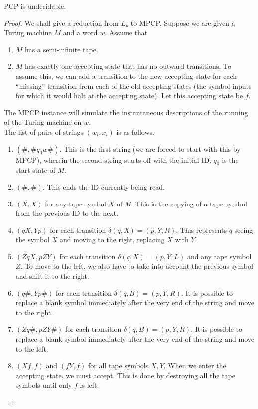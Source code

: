 	\begin{ftheo}
		\textsf{PCP} is undecidable.
	\end{ftheo}
	\begin{proof}
		We shall give a reduction from $L_u$ to \textsf{MPCP}. Suppose we are given a Turing machine $M$ and a word $w$. Assume that
		\begin{enumerate}
			\item $M$ has a semi-infinite tape.
			\item $M$ has exactly one accepting state that has no outward transitions. To assume this, we can add a transition to the new accepting state for each ``missing'' transition from each of the old accepting states (the symbol inputs for which it would halt at the accepting state). Let this accepting state be $f$.  
		\end{enumerate}
		The \textsf{MPCP} instance will simulate the instantaneous descriptions of the running of the Turing machine on $w$.\\
		The list of pairs of strings $(w_i,x_i)$ is as follows.
		\begin{enumerate}
			\item $(\#,\#q_0w\#)$. This is the first string (we are forced to start with this by \textsf{MPCP}), wherein the second string starts off with the initial ID. $q_0$ is the start state of $M$.
			\item $(\#,\#)$. This ends the ID currently being read.
			\item $(X,X)$ for any tape symbol $X$ of $M$. This is the copying of a tape symbol from the previous ID to the next.
			\item $(qX,Yp)$ for each transition $\delta(q,X) = (p,Y,R)$. This represents $q$ seeing the symbol $X$ and moving to the right, replacing $X$ with $Y$.
			\item $(ZqX,pZY)$ for each transition $\delta(q,X) = (p,Y,L)$ and any tape symbol $Z$. To move to the left, we also have to take into account the previous symbol and shift it to the right.
			\item $(q\#,Yp\#)$ for each transition $\delta(q,B) = (p,Y,R)$. It is possible to replace a blank symbol immediately after the very end of the string and move to the right.
			\item $(Zq\#,pZY\#)$ for each transition $\delta(q,B) = (p,Y,R)$. It is possible to replace a blank symbol immediately after the very end of the string and move to the left.
			\item $(Xf,f)$ and $(fY,f)$ for all tape symbols $X,Y$. When we enter the accepting state, we must accept. This is done by destroying all the tape symbols until only $f$ is left.

\end{enumerate}
\end{proof}
